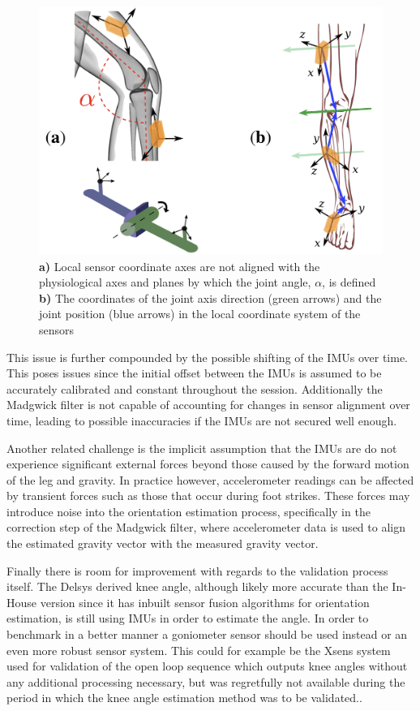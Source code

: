 \begin{figure}
    \centering
    \includegraphics[width=0.75\linewidth]{images/kneeOrientation.png}
    \caption{\textbf{a)} Local sensor coordinate axes are not aligned with the physiological axes and planes by which the joint angle, \(\alpha\), is defined \textbf{b)} The coordinates of the joint axis direction (green arrows) and the joint position (blue arrows) in the local coordinate system of the sensors \cite{seel_imu-based_2014}}
    \label{fig:enter-label}
\end{figure}

This issue is further compounded by the possible shifting of the IMUs over time. This poses issues since the initial offset between the IMUs is assumed to be accurately calibrated and constant throughout the session. Additionally the Madgwick filter is not capable of accounting for changes in sensor alignment over time, leading to possible inaccuracies if the IMUs are not secured well enough.

Another related challenge is the implicit assumption that the IMUs are do not experience significant external forces beyond those caused by the forward motion of the leg and gravity. In practice however, accelerometer readings can be affected by transient forces such as those that occur during foot strikes. These forces may introduce noise into the orientation estimation process, specifically in the correction step of the Madgwick filter, where accelerometer data is used to align the estimated gravity vector with the measured gravity vector.

Finally there is room for improvement with regards to the validation process itself. The Delsys derived knee angle, although likely more accurate than the In-House version since it has inbuilt sensor fusion algorithms for orientation estimation, is still using IMUs in order to estimate the angle. In order to benchmark in a better manner a goniometer sensor should be used instead or an even more robust sensor system. This could for example be the Xsens system used for validation of the open loop sequence which outputs knee angles without any additional processing necessary, but was regretfully not available during the period in which the knee angle estimation method was to be validated.. 

